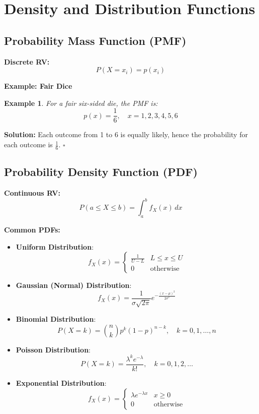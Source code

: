 \documentclass[12pt]{article}
\newtheorem{example}{Example}
\newenvironment{solution}{\noindent\textbf{Solution:}}{\hfill$\square$}
\begin{document}
\section{Density and Distribution Functions}
\subsection{Probability Mass Function (PMF)}
\textbf{Discrete RV:}
\[
P(X = x_i) = p(x_i)
\]

\textbf{Example: Fair Dice}
\begin{example}
For a fair six-sided die, the PMF is:
\[
p(x) = \frac{1}{6}, \quad x = 1, 2, 3, 4, 5, 6
\]
\end{example}
\begin{solution}
Each outcome from 1 to 6 is equally likely, hence the probability for each outcome is \( \frac{1}{6} \).
\end{solution}

\subsection{Probability Density Function (PDF)}
\textbf{Continuous RV:}
\[
P(a \leq X \leq b) = \int_a^b f_X(x) \, dx
\]

\textbf{Common PDFs:}
\begin{itemize}
    \item \textbf{Uniform Distribution}:
    \[
    f_X(x) = 
    \begin{cases} 
    \frac{1}{U - L} & L \leq x \leq U \\
    0 & \text{otherwise}
    \end{cases}
    \]
    \item \textbf{Gaussian (Normal) Distribution}:
    \[
    f_X(x) = \frac{1}{\sigma \sqrt{2\pi}} e^{ -\frac{(x - \mu)^2}{2\sigma^2} }
    \]
    \item \textbf{Binomial Distribution}:
    \[
    P(X = k) = \binom{n}{k} p^k (1-p)^{n-k}, \quad k = 0,1,\ldots,n
    \]
    \item \textbf{Poisson Distribution}:
    \[
    P(X = k) = \frac{\lambda^k e^{-\lambda}}{k!}, \quad k = 0,1,2,\ldots
    \]
    \item \textbf{Exponential Distribution}:
    \[
    f_X(x) = 
    \begin{cases} 
    \lambda e^{-\lambda x} & x \geq 0 \\
    0 & \text{otherwise}
    \end{cases}
    \]
\end{itemize}
\end{document}
